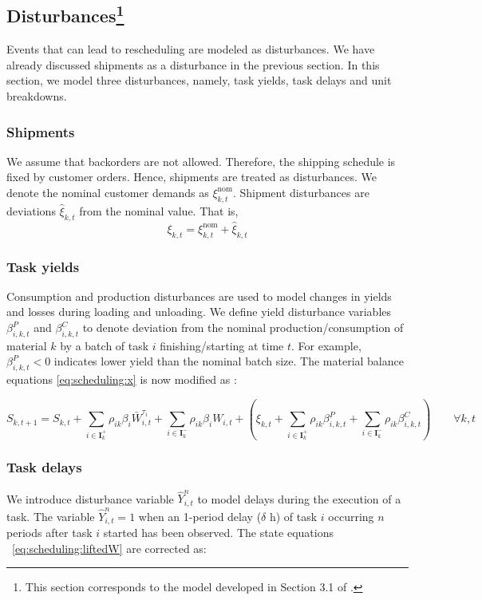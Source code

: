 \subsection{Disturbances\footnote{This section corresponds to the model developed in Section 3.1 of
  \citet{subramanian:maravelias:rawlings:2012}.} }

Events that can lead to rescheduling are modeled as disturbances. We
have already discussed shipments as a disturbance in the previous
section. In this section, we model three disturbances, namely, task yields, task
delays and unit breakdowns. 

\subsubsection{Shipments}
We assume that backorders are not allowed. Therefore, the shipping
schedule is fixed by customer orders. Hence, shipments are treated as
disturbances. We denote the nominal customer demands as
${\xi}_{k,t}^{\text{nom}}$. Shipment disturbances are deviations
$\hat{\xi}_{k,t}$ from the nominal value. That is,
\[ \xi_{k,t} = \xi_{k,t}^{\text{nom}} + \hat{\xi}_{k,t} \] 


\subsubsection{Task yields}
Consumption and production disturbances are used to model changes in
yields and losses during loading and
unloading. We define  yield disturbance variables $\beta_{i,k,t}^P$
and $\beta_{i,k,t}^C$ to denote deviation from the nominal
production/consumption of material $k$ by a batch of task $i$
finishing/starting at time $t$. For example, $\beta_{i,k,t}^P < 0$
indicates lower yield than the nominal batch size. The material
balance equations \eqref{eq:scheduling:x} is now modified as :

\begin{equation}
\label{eq:scheduling:yield_loss}
S_{k,t+1} = S_{k,t} + \sum_{i\in
  \mathbf{I}_k^+}\rho_{ik}\beta_i\bar{W}_{i,t}^{\tau_i} + \sum_{i\in
  \mathbf{I}_k^-}\rho_{ik}\beta_iW_{i,t}+ \left(\xi_{k,t} + \sum_{i\in
  \mathbf{I}_k^+}\rho_{ik}\beta_{i,k,t}^{P} +\sum_{i\in
  \mathbf{I}_k^-}\rho_{ik}\beta_{i,k,t}^{C}\right)    \qquad \forall k,t
\end{equation}

\subsubsection{Task delays}
We introduce
disturbance variable $\hat{Y}_{i,t}^{n}$ to model delays during the
execution of a task. The variable $\hat{Y}_{i,t}^{n} = 1$ when an 1-period delay
($\delta$ h) of task $i$ occurring $n$ periods after task $i$
started has been observed. The state equations ~\eqref{eq:scheduling:liftedW} are corrected as:

